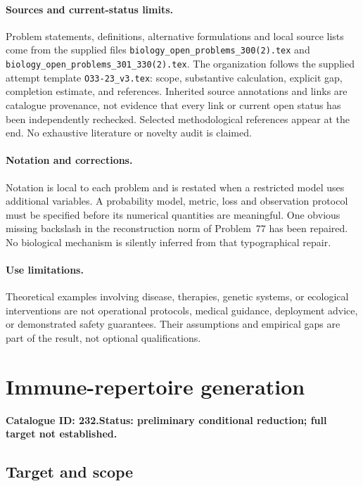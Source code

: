 \documentclass[11pt]{article}
\begin{document}
\paragraph{Sources and current-status limits.}
Problem statements, definitions, alternative formulations and local source lists
come from the supplied files
\texttt{biology\_open\_problems\_300(2).tex} and
\texttt{biology\_open\_problems\_301\_330(2).tex}.
The organization follows the supplied attempt template
\texttt{O33-23\_v3.tex}: scope, substantive calculation, explicit gap,
completion estimate, and references. Inherited source annotations and links are
catalogue provenance, not evidence that every link or current open status has
been independently rechecked. Selected methodological references appear at the
end. No exhaustive literature or novelty audit is claimed.

\paragraph{Notation and corrections.}
Notation is local to each problem and is restated when a restricted model uses
additional variables. A probability model, metric, loss and observation protocol
must be specified before its numerical quantities are meaningful. One obvious
missing backslash in the reconstruction norm of Problem~77 has been repaired.
No biological mechanism is silently inferred from that typographical repair.

\paragraph{Use limitations.}
Theoretical examples involving disease, therapies, genetic systems, or ecological
interventions are not operational protocols, medical guidance, deployment advice,
or demonstrated safety guarantees. Their assumptions and empirical gaps are part
of the result, not optional qualifications.

\setcounter{section}{231}
\section{Immune-repertoire generation}
\label{prob:232}
\noindent\textbf{Catalogue ID: 232.}\quad \textbf{Status: preliminary conditional reduction; full target not established.}
\subsection{Target and scope}
\end{document}
